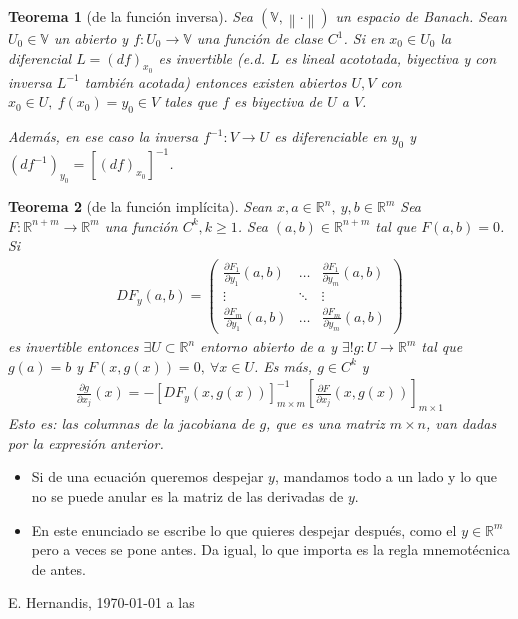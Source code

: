 \documentclass[a4paper,twocolumn]{extarticle}
\newcommand{\R}{\mathbb{R}}
\newcommand{\V}{\mathbb{V}}
\newcommand{\norma}[1]{\left\lVert#1\right\rVert}
\newtheorem*{thm}{Teorema}
\begin{document}
\begin{thm}[de la función inversa]
	Sea $(\V, \norma{\cdot})$ un espacio de Banach. Sean $U_0 \in \V$ un abierto y $f:U_0 \to \V$ una función de clase $C^1$. Si en $x_0 \in U_0$ la diferencial $L = (df)_{x_0}$ es invertible (e.d. $L$ es lineal acototada, biyectiva y con inversa $L^{-1}$ también acotada) entonces existen abiertos $U, V$ con $x_0 \in U,\ f(x_0) = y_0 \in V$  tales que $f$ es biyectiva de $U$ a $V$.
	
	Además, en ese caso la inversa $f^{-1}:V \to U$ es diferenciable en $y_0$ y $(df^{-1})_{y_0} = [(df)_{x_0}]^{-1}$.
\end{thm}

\begin{thm}[de la función implícita]
	Sean $x,a \in \R^n,\ y,b \in \R^m$
	Sea $F: \R^{n+m} \to \R^m$ una función $C^k, k \geq 1$. Sea $(a,b) \in \R^{n+m}$ tal que $F(a,b) = 0$. Si
	\begin{align*}
		DF_y(a,b) = \left(\begin{array}{ccc}
		\frac{\partial F_1}{\partial y_1}(a,b) & \dots & \frac{\partial F_1}{\partial y_m}(a,b) \\
		\vdots & \ddots & \vdots \\
		\frac{\partial F_m}{\partial y_1}(a,b) & \dots & \frac{\partial F_m}{\partial y_m}(a,b)
		\end{array}\right)
	\end{align*}
	es invertible entonces $\exists U \subset \R^n$ entorno abierto de $a$ y $\exists! g:U \to \R^m$ tal que $g(a) = b$ y $F(x, g(x)) = 0,\ \forall x \in U$. Es más, $g \in C^k$ y
	\begin{align*}
		\frac{\partial g}{\partial x_j}(x) = -\left[DF_y(x, g(x))\right]^{-1}_{m\times m}\left[\frac{\partial F}{\partial x_j}(x, g(x))\right]_{m \times 1}
	\end{align*}
	Esto es: las columnas de la jacobiana de $g$, que es una matriz $m \times n$, van dadas por la expresión anterior.
\end{thm}
\begin{itemize}
	\item Si de una ecuación queremos despejar $y$, mandamos todo a un lado y lo que no se puede anular es la matriz de las derivadas de $y$.
	\item En este enunciado se escribe lo que quieres despejar después, como el $y \in \R^m$ pero a veces se pone antes. Da igual, lo que importa es la regla mnemotécnica de antes.
\end{itemize}

\begin{flushright}
	E. Hernandis, \today $ $ a las \currenttime
\end{flushright}
\end{document}
